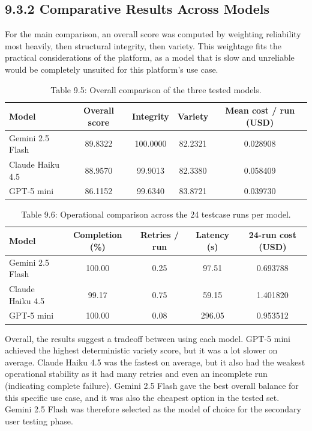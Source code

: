 \documentclass[
  12pt,
  a4paper,
]{report}
\begin{document}
\hypertarget{comparative-results-across-models}{%
\subsection{9.3.2 Comparative Results Across
Models}\label{comparative-results-across-models}}

For the main comparison, an overall score was computed by weighting
reliability most heavily, then structural integrity, then variety. This
weightage fits the practical considerations of the platform, as a model that is slow
and unreliable would be completely unsuited for this platform's use case.

\begin{table}[H]
\centering
\small
\begin{tabular}{@{}p{}c c c c@{}}
\toprule
Model & Overall score & Integrity & Variety & Mean cost / run (USD) \\
\midrule
Gemini 2.5 Flash & 89.8322 & 100.0000 & 82.2321 & 0.028908 \\
Claude Haiku 4.5 & 88.9570 & 99.9013 & 82.3380 & 0.058409 \\
GPT-5 mini & 86.1152 & 99.6340 & 83.8721 & 0.039730 \\
\bottomrule
\end{tabular}
\caption*{Table 9.5: Overall comparison of the three tested models.}
\end{table}

\begin{table}[H]
\centering
\scriptsize
\begin{tabular}{@{}p{}c c c c@{}}
\toprule
Model & Completion (\%) & Retries / run & Latency (s) & 24-run cost (USD) \\
\midrule
Gemini 2.5 Flash & 100.00 & 0.25 & 97.51 & 0.693788 \\
Claude Haiku 4.5 & 99.17 & 0.75 & 59.15 & 1.401820 \\
GPT-5 mini & 100.00 & 0.08 & 296.05 & 0.953512 \\
\bottomrule
\end{tabular}
\caption*{Table 9.6: Operational comparison across the 24 testcase runs per model.}
\end{table}

Overall, the results suggest a tradeoff between using each model. GPT-5 mini
achieved the highest deterministic variety score, but it was a lot slower
on average. Claude Haiku 4.5 was the fastest on average, but it also
had the weakest operational stability as it had many retries and even an
incomplete run (indicating complete failure). Gemini 2.5 Flash gave the best overall balance for
this specific use case, and it was also the cheapest option in the tested set. Gemini 2.5 Flash was
therefore selected as the model of choice for the secondary user testing phase.
\end{document}

